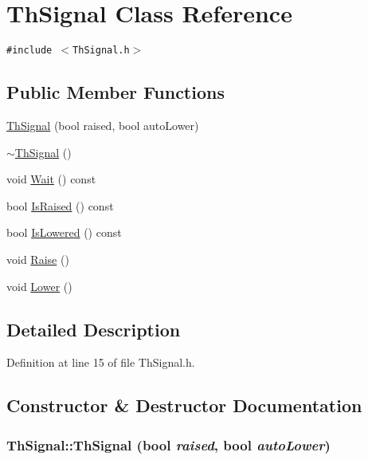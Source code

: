\hypertarget{class_th_signal}{
\section{ThSignal Class Reference}
\label{class_th_signal}
}
{\tt \#include $<$ThSignal.h$>$}

\subsection*{Public Member Functions}
\begin{CompactItemize}
\item 
\hyperlink{class_th_signal_8f9309170f47d93d0e26e48227d9d2c6}{ThSignal} (bool raised, bool autoLower)
\item 
\hyperlink{class_th_signal_8e7c1cc0ed668083c257196738f4bc99}{$\sim$ThSignal} ()
\item 
void \hyperlink{class_th_signal_10bb9c646beb4ae8d7fe3e468ab513b0}{Wait} () const 
\item 
bool \hyperlink{class_th_signal_82ec65969dc097efc86828eb679fc8cc}{IsRaised} () const 
\item 
bool \hyperlink{class_th_signal_5b57838592cf1dcca20f62e901722118}{IsLowered} () const 
\item 
void \hyperlink{class_th_signal_8609e6122614a6b3fac9ec6185008b7a}{Raise} ()
\item 
void \hyperlink{class_th_signal_a68ff9fdb643e52e789618d9416515ba}{Lower} ()
\end{CompactItemize}


\subsection{Detailed Description}


Definition at line 15 of file ThSignal.h.

\subsection{Constructor \& Destructor Documentation}
\hypertarget{class_th_signal_8f9309170f47d93d0e26e48227d9d2c6}{
\subsubsection[{ThSignal}]{\setlength{\rightskip}{0pt plus 5cm}ThSignal::ThSignal (bool {\em raised}, \/  bool {\em autoLower})}}
\label{class_th_signal_8f9309170f47d93d0e26e48227d9d2c6}




